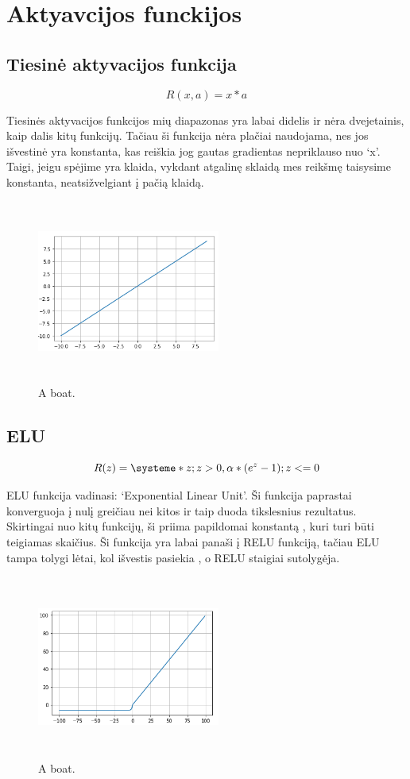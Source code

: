 \documentclass{VUMIFInfKursinis}
\begin{document}
\section{Aktyavcijos funckijos}
\subsection{Tiesinė aktyvacijos funkcija}
\[
R(x, a) = x * a
\]
\par
Tiesinės aktyvacijos funkcijos mių diapazonas yra labai didelis ir nėra dvejetainis,
kaip dalis kitų funkcijų. Tačiau ši funkcija nėra plačiai naudojama, nes jos
išvestinė yra konstanta, kas reiškia jog gautas gradientas nepriklauso nuo ‘x’.
Taigi, jeigu spėjime yra klaida, vykdant atgalinę sklaidą mes reikšmę taisysime
konstanta, neatsižvelgiant į pačią klaidą.

\begin{figure}[ht]
  \includegraphics[width=6cm,height=6cm,keepaspectratio]{tiesine.png}
  \caption{A boat.}
  \label{fig:boat1}
\end{figure}

\subsection{ELU}
\[
  R(z) = \systeme*{z; z > 0, \alpha*(e^z - 1); z <= 0}
\]
\par
ELU funkcija vadinasi: ‘Exponential Linear Unit’. Ši funkcija paprastai konverguoja į
nulį greičiau nei kitos ir taip duoda tikslesnius rezultatus. Skirtingai nuo kitų
funkcijų, ši priima papildomai konstantą , kuri turi būti teigiamas skaičius.
Ši funkcija yra labai panaši į RELU funkciją, tačiau ELU tampa tolygi lėtai,
kol išvestis pasiekia , o RELU staigiai sutolygėja.

\begin{figure}[ht]
  \includegraphics[width=6cm,height=6cm,keepaspectratio]{elu.png}
  \caption{A boat.}
  \label{fig:boat1}
\end{figure}
\end{document}
